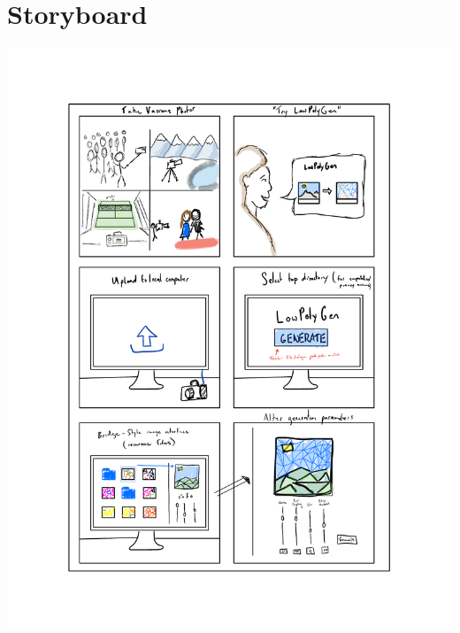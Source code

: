 \documentclass{article}
\begin{document}
\section{Storyboard}
\centerline{\includegraphics[scale = 0.8]{TP1.pdf}}
\end{document}
